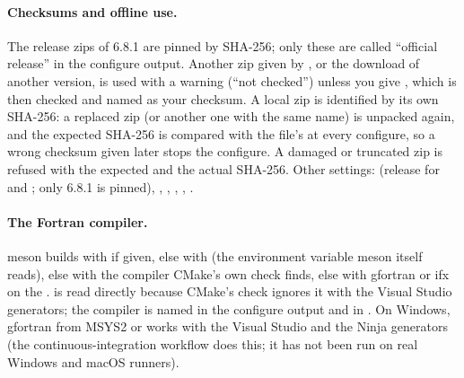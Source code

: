 \paragraph{Checksums and offline use.} The release zips of 6.8.1 are pinned by SHA-256; only these are called ``official
release'' in the configure output. Another zip given by , or the download of another version, is used
with a warning (``not checked'') unless you give , which is then checked and named as
your checksum. A local zip is identified by its own SHA-256: a replaced zip (or another one with the same name) is
unpacked again, and the expected SHA-256 is compared with the file's at every configure, so a wrong checksum given later
stops the configure. A damaged or truncated zip is refused with the expected and the actual SHA-256.
Other settings:  (release for  and ; only 6.8.1 is pinned),
, , , ,
.

\paragraph{The Fortran compiler.} meson builds with  if given, else with  (the
environment variable meson itself reads), else with the compiler CMake's own check finds, else with gfortran or ifx on
the .  is read directly because CMake's check ignores it with the Visual Studio generators; the
compiler is named in the configure output and in . On Windows, gfortran from MSYS2 or
 works with the Visual Studio and the Ninja generators (the continuous-integration
workflow  does this; it has not been run on real Windows and macOS runners).

